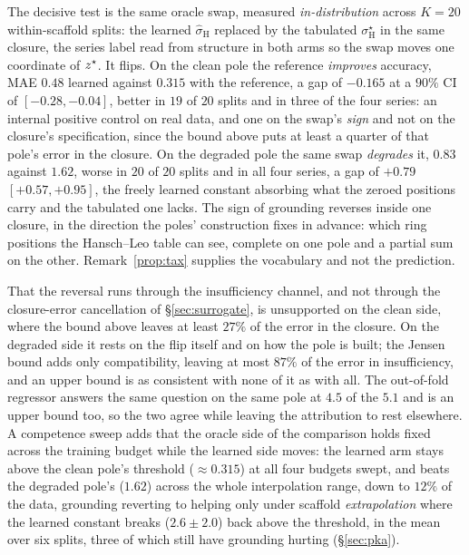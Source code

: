 The decisive test is the same oracle swap, measured \emph{in-distribution} across $K{=}20$
within-scaffold splits: the learned $\hat\sigma_{\mathrm H}$ replaced by the tabulated
$\sigma_{\mathrm H}^\star$ in the same closure, the series label read from structure in both arms so
the swap moves one coordinate of $z^\star$. It flips. On the clean pole the reference \emph{improves}
accuracy, MAE $0.48$ learned against $0.315$ with the reference, a gap of $-0.165$ at a $90\%$ CI of
$[-0.28,-0.04]$, better in $19$ of $20$ splits and in three of the four series: an internal positive
control on real data, and one on the swap's \emph{sign} and not on the closure's specification,
since the bound above puts at least a quarter of that pole's error in the closure. On the degraded
pole the same swap \emph{degrades} it, $0.83$ against $1.62$, worse in $20$ of $20$ splits and in
all four series, a gap of $+0.79$ $[{+}0.57,{+}0.95]$, the freely learned constant absorbing what
the zeroed positions carry and the tabulated one lacks. The sign of grounding reverses inside one
closure, in the direction the poles' construction fixes in advance: which ring positions the
Hansch--Leo table can see, complete on one pole and a partial sum on the other.
Remark~\ref{prop:tax} supplies the vocabulary and not the prediction.

That the reversal runs through the insufficiency channel, and not through the closure-error
cancellation of \S\ref{sec:surrogate}, is unsupported on the clean side, where the bound above
leaves at least $27\%$ of the error in the closure. On the degraded side it rests on the flip itself
and on how the pole is built; the Jensen bound adds only compatibility, leaving at most $87\%$ of
the error in insufficiency, and an upper bound is as consistent with none of it as with all. The
out-of-fold regressor answers the same question on the same pole at $4.5$ of the $5.1$ and is an
upper bound too, so the two agree while leaving the attribution to rest elsewhere. A competence
sweep adds that the oracle side of the comparison holds fixed across the training budget while the
learned side moves: the learned arm stays above the clean pole's threshold ($\approx0.315$) at all
four budgets swept, and beats the degraded pole's ($1.62$) across the whole interpolation range,
down to $12\%$ of the data, grounding reverting to helping only under scaffold \emph{extrapolation}
where the learned constant breaks ($2.6{\pm}2.0$) back above the threshold, in the mean over six
splits, three of which still have grounding hurting (\S\ref{sec:pka}).

